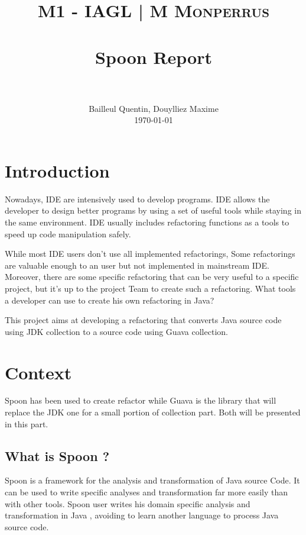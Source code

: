 \documentclass[paper=a4, fontsize=11pt]{scrartcl}
\title{
  \usefont{OT1}{bch}{b}{n}
  \normalfont \normalsize \textsc{M1 - IAGL | M Monperrus}
  \\ [25pt]
  \horrule{0.5pt} \\[0.4cm]
  \huge Spoon Report\\
  \horrule{2pt} \\[0.5cm]
}
\author{
  \normalfont \normalsize
  Bailleul Quentin, Douylliez Maxime\\[-3pt]\normalsize
        \today
}
\date{}
\numberwithin{equation}{section}%
\numberwithin{figure}{section}%
\numberwithin{table}{section}%
\begin{document}
\maketitle
\tableofcontents



\newpage

\section{Introduction}
Nowadays, IDE are intensively used to develop programs.  IDE allows
the developer to design better programs by using a set of useful tools
while staying in the same environment. IDE usually includes
refactoring functions as a tools to speed up code manipulation safely.
\newline


While most IDE users don't use all implemented refactorings, Some
refactorings are valuable enough to an user but not implemented in
mainstream IDE. Moreover, there are some specific refactoring that can
be very useful to a specific project, but it's up to the project Team
to create such a refactoring. What tools a developer can use to create
his own refactoring in Java?
\newline

This project aims at developing a refactoring that converts Java
source code using JDK collection to a source code using Guava
collection.
\newpage


\section{Context}
Spoon has been used to create refactor while Guava is the library that
will replace the JDK one for a small portion of collection part. Both
will be presented in this part.  


\subsection{What is Spoon ?}
Spoon is a framework for the analysis and transformation of Java
source Code. It can be used to write specific analyses and
transformation far more easily than with other tools. Spoon user
writes his domain specific analysis and transformation in Java ,
avoiding to learn another language to process Java source
code. \newline 
\end{document}
